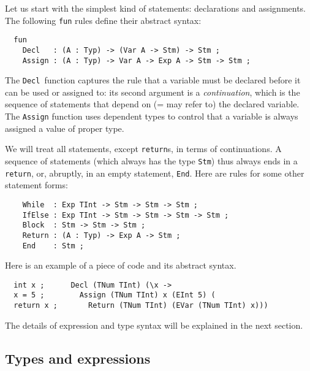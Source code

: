 \documentclass[12pt]{article}
\newcommand{\empha}[1]{{\em #1}}
\begin{document}
Let us start with the simplest kind of statements:
declarations and assignments. The following \texttt{fun}
rules define their abstract syntax:
\begin{verbatim}
  fun
    Decl   : (A : Typ) -> (Var A -> Stm) -> Stm ;
    Assign : (A : Typ) -> Var A -> Exp A -> Stm -> Stm ;
\end{verbatim}
The \texttt{Decl}\ function captures the rule that
a variable must be declared before it can be used or assigned to:
its second argument is a \empha{continuation}, which is
the sequence of statements that depend on (= may refer to)
the declared variable. 
The \texttt{Assign} function uses dependent types to 
control that a variable is always assigned a value of proper
type. 

We will treat all statements, except
\texttt{return}s, in terms of continuations. A sequence of
statements (which always has the type \texttt{Stm}) thus
always ends in a \texttt{return}, or, abruptly, in
an empty statement, \texttt{End}. Here are rules for some other
statement forms:
\begin{verbatim}
    While  : Exp TInt -> Stm -> Stm -> Stm ;
    IfElse : Exp TInt -> Stm -> Stm -> Stm -> Stm ;
    Block  : Stm -> Stm -> Stm ;
    Return : (A : Typ) -> Exp A -> Stm ;
    End    : Stm ;
\end{verbatim}
Here is an example of a piece of code and its abstract syntax.
\begin{verbatim}
  int x ;      Decl (TNum TInt) (\x -> 
  x = 5 ;        Assign (TNum TInt) x (EInt 5) (
  return x ;       Return (TNum TInt) (EVar (TNum TInt) x)))
\end{verbatim}
The details of expression and type 
syntax will be explained in the next section.



\subsection{Types and expressions}
\end{document}

